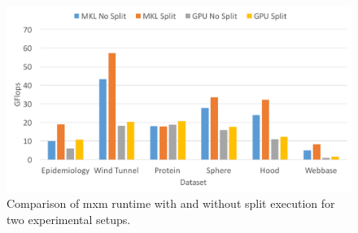 \begin{figure}
	\centering
	\includegraphics[width=.9\linewidth]{gflops.pdf}
	\caption{Comparison of {\sf mxm} runtime with and without split execution for two experimental setups.}
	\label{fig:gflops}
\end{figure}